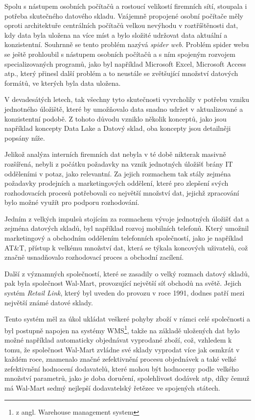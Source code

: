 \documentclass[
  digital,     %
  twoside,     %
  lof,         %
  lot,         %
]{fithesis4}
\begin{document}
Spolu s nástupem osobních počítačů a rostoucí velikostí firemních sítí, stoupala i potřeba skutečného datového skladu. Vzájemně propojené osobní počítače měly oproti architektuře centrálních počítačů velkou nevýhodu v roztříštěnosti dat, kdy data byla uložena na více míst a bylo složité udržovat data aktuální a konzistentní. Souhrnně se tento problém nazývá \emph{spider web}. \parencite[s.~6]{Inmon2005} Problém spider webu se ještě prohloubil s nástupem osobních počítačů a s ním spojeným rozvojem specializovaných programů, jako byl například Microsoft Excel, Microsoft Access atp., který přinesl další problém a to neustále se zvětšující množství datových formátů, ve kterých byla data uložena.\parencite{Foote19042018}

V devadesátých letech, tak všechny tyto skutečnosti vyvrcholily v potřebu vzniku jednotného úložiště, které by umožňovalo data snadno udržet v aktualizované a konzistentní podobě. Z tohoto důvodu vzniklo několik konceptů, jako jsou například koncepty Data Lake a Datový sklad, oba koncepty jsou detailněji popsány níže.

Jelikož analýza interních firemních dat nebyla v té době nikterak masivně rozšířená, nebyli z počátku požadavky na vznik jednotných úložišť brány IT odděleními v potaz, jako relevantní. Za jejich rozmachem tak stály zejména požadavky prodejních a marketingových oddělení, které pro zlepšení svých rozhodovacích procesů potřebovali co největší množství dat, jejichž zpracování bylo možné využít pro podporu rozhodování. \parencite{Inmon2021}

Jedním z velkých impulsů stojícím za rozmachem vývoje jednotných úložišť dat a zejména datových skladů, byl například rozvoj mobilních telefonů. Který umožnil marketingový a obchodním oddělením telefonních společností, jako je například AT\&T, přístup k velkému množství dat, která se týkala koncových uživatelů, což značně usnadňovalo rozhodovací proces a obchodní zacílení.\parencite{Inmon2021}

Další z významných společností, které se zasadily o velký rozmach datový skladů, pak byla společnost Wal-Mart, provozující největší síť obchodů na světě. Jejich systém \emph{Retail Link}, který byl uveden do provozu v roce 1991, dodnes patří mezi největší známé datové sklady.\parencite{Gallaugher2018}

Tento systém měl za úkol ukládat veškeré pohyby zboží v rámci celé společnosti a byl postupně napojen na systémy WMS\footnote{z angl. Warehouse management system}, takže na základě uložených dat bylo možné například automaticky objednávat vyprodané zboží, což, vzhledem k tomu, že společnost Wal-Mart zvládne své sklady vyprodat více jak osmkrát v každém roce, znamenalo značné zefektivnění procesu objednávek a také velké zefektivnění hodnocení dodavatelů, které mohou být hodnoceny podle velkého množství parametrů, jako je doba doručení, spolehlivost dodávek atp, díky čemuž má Wal-Mart sedmý nejlepší dodavatelský řetězec ve spojených státech.\parencite{Gallaugher2018}  
\end{document}

